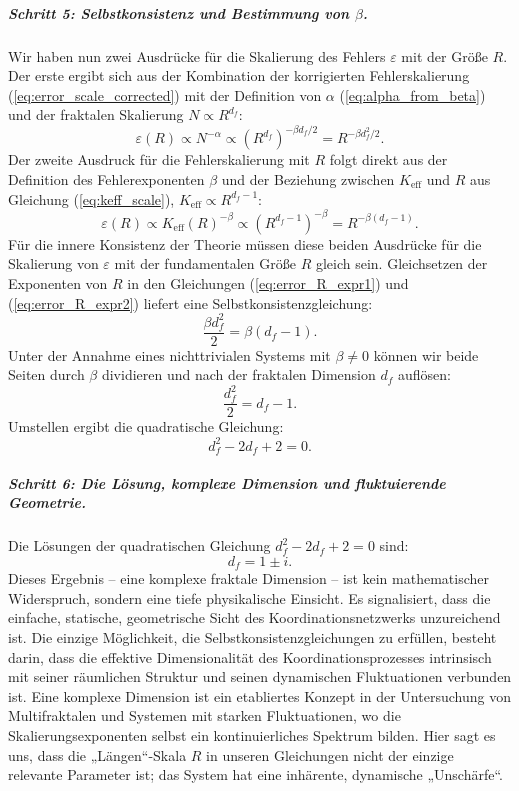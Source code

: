 \documentclass[12pt,a4paper]{article}
\theoremstyle{remark}
\newcommand{\Ke}{K_{\mathrm{eff}}}
\begin{document}
	\subparagraph*{Schritt 5: Selbstkonsistenz und Bestimmung von \(\beta\).}
	Wir haben nun zwei Ausdrücke für die Skalierung des Fehlers \(\varepsilon\) mit der Größe \(R\). Der erste ergibt sich aus der Kombination der korrigierten Fehlerskalierung (\ref{eq:error_scale_corrected}) mit der Definition von \(\alpha\) (\ref{eq:alpha_from_beta}) und der fraktalen Skalierung \(N \propto R^{d_f}\):
	\begin{equation}
		\varepsilon(R) \propto N^{-\alpha} \propto (R^{d_f})^{-\beta d_f/2} = R^{-\beta d_f^2 / 2}.
		\label{eq:error_R_expr1}
	\end{equation}
	Der zweite Ausdruck für die Fehlerskalierung mit \(R\) folgt direkt aus der Definition des Fehlerexponenten \(\beta\) und der Beziehung zwischen \(\Ke\) und \(R\) aus Gleichung (\ref{eq:keff_scale}), \(\Ke \propto R^{d_f-1}\):
	\begin{equation}
		\varepsilon(R) \propto \Ke(R)^{-\beta} \propto (R^{d_f-1})^{-\beta} = R^{-\beta(d_f-1)}.
		\label{eq:error_R_expr2}
	\end{equation}
	Für die innere Konsistenz der Theorie müssen diese beiden Ausdrücke für die Skalierung von \(\varepsilon\) mit der fundamentalen Größe \(R\) gleich sein. Gleichsetzen der Exponenten von \(R\) in den Gleichungen (\ref{eq:error_R_expr1}) und (\ref{eq:error_R_expr2}) liefert eine Selbstkonsistenzgleichung:
	\begin{equation}
		\frac{\beta d_f^2}{2} = \beta (d_f - 1).
		\label{eq:consistency}
	\end{equation}
	Unter der Annahme eines nichttrivialen Systems mit \(\beta \neq 0\) können wir beide Seiten durch \(\beta\) dividieren und nach der fraktalen Dimension \(d_f\) auflösen:
	\begin{equation}
		\frac{d_f^2}{2} = d_f - 1.
	\end{equation}
	Umstellen ergibt die quadratische Gleichung:
	\begin{equation}
		d_f^2 - 2d_f + 2 = 0.
		\label{eq:quadratic}
	\end{equation}
	
	\subparagraph*{Schritt 6: Die Lösung, komplexe Dimension und fluktuierende Geometrie.}
	Die Lösungen der quadratischen Gleichung \(d_f^2 - 2d_f + 2 = 0\) sind:
	\begin{equation}
		d_f = 1 \pm i.
		\label{eq:df_solution}
	\end{equation}
	Dieses Ergebnis – eine komplexe fraktale Dimension – ist kein mathematischer Widerspruch, sondern eine tiefe physikalische Einsicht. Es signalisiert, dass die einfache, statische, geometrische Sicht des Koordinationsnetzwerks unzureichend ist. Die einzige Möglichkeit, die Selbstkonsistenzgleichungen zu erfüllen, besteht darin, dass die effektive Dimensionalität des Koordinationsprozesses intrinsisch mit seiner räumlichen Struktur und seinen dynamischen Fluktuationen verbunden ist. Eine komplexe Dimension ist ein etabliertes Konzept in der Untersuchung von Multifraktalen und Systemen mit starken Fluktuationen, wo die Skalierungsexponenten selbst ein kontinuierliches Spektrum bilden. Hier sagt es uns, dass die „Längen“-Skala \(R\) in unseren Gleichungen nicht der einzige relevante Parameter ist; das System hat eine inhärente, dynamische „Unschärfe“.
	
\end{document}
